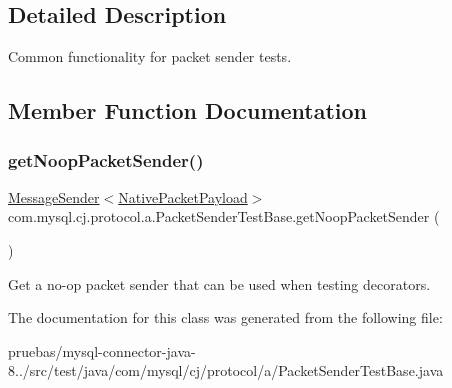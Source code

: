 \subsection{Detailed Description}
Common functionality for packet sender tests. 

\subsection{Member Function Documentation}
\mbox{\label{classcom_1_1mysql_1_1cj_1_1protocol_1_1a_1_1_packet_sender_test_base_a0e37ea21e80f4299d9114934ea4ac93e}} 
\subsubsection{\texorpdfstring{get\+Noop\+Packet\+Sender()}{getNoopPacketSender()}}
{\footnotesize\ttfamily \mbox{\hyperlink{interfacecom_1_1mysql_1_1cj_1_1protocol_1_1_message_sender}{Message\+Sender}}$<$\mbox{\hyperlink{classcom_1_1mysql_1_1cj_1_1protocol_1_1a_1_1_native_packet_payload}{Native\+Packet\+Payload}}$>$ com.\+mysql.\+cj.\+protocol.\+a.\+Packet\+Sender\+Test\+Base.\+get\+Noop\+Packet\+Sender (\begin{DoxyParamCaption}{ }\end{DoxyParamCaption})\hspace{0.3cm}{\ttfamily [protected]}}

Get a no-\/op packet sender that can be used when testing decorators. 

The documentation for this class was generated from the following file\+:\begin{DoxyCompactItemize}
\item 
pruebas/mysql-\/connector-\/java-\/8../src/test/java/com/mysql/cj/protocol/a/Packet\+Sender\+Test\+Base.\+java\end{DoxyCompactItemize}
